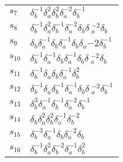 \documentclass{article}
\begin{document}
\begin{center}
\begin{tabular}{ll}
$s_{7}$ & $\delta_b^{-1}\delta_a^{2}\delta_b^{2}\delta_a^{-2}\delta_b^{-1}$ \\
$s_{8}$ & $\delta_b^{-1}\delta_a^{2}\delta_b^{-1}\delta_a^{-2}\delta_b^{}\delta\
_a^{-2}\delta_b^{}$ \\
$s_{9}$ & $\delta_b^{}\delta_a^{-1}\delta_b^{}\delta_a^{-1}\delta_b^{}\delta_a^\
{-2}\delta_b^{-1}$ \\
$s_{10}$ & $\delta_b^{-1}\delta_a^{-1}\delta_b^{}\delta_a^{-1}\delta_b^{}\delta\
_a^{-2}\delta_b^{}$ \\
$s_{11}$ & $\delta_b^{-1}\delta_a^{}\delta_b^{}\delta_a^{-1}\delta_b^{2}$ \\
$s_{12}$ & $\delta_b^{-1}\delta_a^{}\delta_b^{-1}\delta_a^{-1}\delta_b^{}\delta\
_a^{-2}\delta_b^{-1}$ \\
$s_{13}$ & $\delta_b^{3}\delta_a^{-1}\delta_b^{-1}\delta_a^{-2}\delta_b^{-1}$ \\
$s_{14}$ & $\delta_b^{}\delta_a^{2}\delta_b^{2}\delta_a^{-1}\delta_b^{-2}$ \\
$s_{15}$ & $\delta_b^{-3}\delta_a^{-1}\delta_b^{}\delta_a^{-2}\delta_b^{}$ \\
$s_{16}$ & $\delta_b^{-1}\delta_a^{2}\delta_b^{-2}\delta_a^{-1}\delta_b^{2}$ \\
\bottomrule
\end{tabular}
\end{center}

\thispagestyle{empty}
\end{document}

